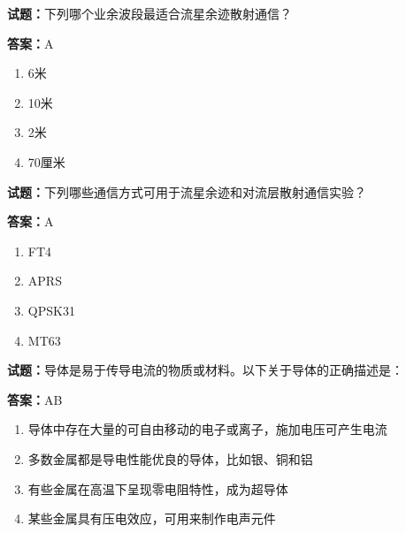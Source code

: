 \documentclass{ctexbook}
\begin{document}




\vspace{1em}

\textbf{试题：}下列哪个业余波段最适合流星余迹散射通信？ 

\textbf{答案：}A 

\begin{enumerate}[leftmargin=3em]
  \item 6米 

  \item 10米 

  \item 2米 

  \item 70厘米 

\end{enumerate}






\vspace{1em}

\textbf{试题：}下列哪些通信方式可用于流星余迹和对流层散射通信实验？ 

\textbf{答案：}A 

\begin{enumerate}[leftmargin=3em]
  \item FT4 

  \item APRS 

  \item QPSK31 

  \item MT63 

\end{enumerate}





\vspace{1em}

\textbf{试题：}导体是易于传导电流的物质或材料。以下关于导体的正确描述是： 

\textbf{答案：}AB 

\begin{enumerate}[leftmargin=3em]
  \item 导体中存在大量的可自由移动的电子或离子，施加电压可产生电流 

  \item 多数金属都是导电性能优良的导体，比如银、铜和铝 

  \item 有些金属在高温下呈现零电阻特性，成为超导体 

  \item 某些金属具有压电效应，可用来制作电声元件 

\end{enumerate}
\end{document}
